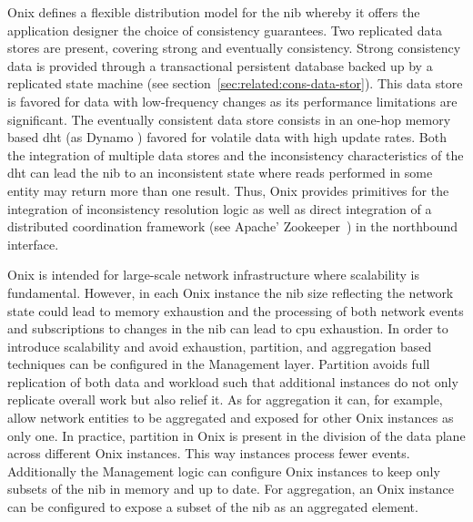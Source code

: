 Onix defines a flexible distribution model for the \gls{nib} whereby  it offers the application designer the choice of consistency guarantees. 
Two replicated data stores are present, covering  strong  and eventually consistency. 
Strong consistency data is provided through a transactional persistent database backed up by a replicated state machine (see section~\ref{sec:related:cons-data-stor}). 
This data store is favored for data with low-frequency changes  as its performance limitations are significant. 
The eventually consistent data store consists in  an one-hop memory based \gls{dht}  (as Dynamo  \cite{DeCandia:2007cn}) favored for  volatile data with high update rates. 
Both the integration of multiple data stores and the inconsistency characteristics of the \gls{dht} can lead the \gls{nib} to an inconsistent state where reads performed in some entity may return more than one result. 
Thus, Onix provides primitives for the integration of inconsistency resolution logic as well as  direct integration of a distributed coordination framework (see  Apache' Zookeeper~\cite{Hunt:2010ux}) in the northbound interface. 

Onix is intended for large-scale network infrastructure where scalability is fundamental. 
However, in each Onix instance the \gls{nib}  size reflecting the network state could lead to memory exhaustion and the processing of both network events and subscriptions  to changes in  the \gls{nib}  can lead to \gls{cpu} exhaustion.
In order to introduce scalability and avoid exhaustion, partition, and aggregation based techniques can be configured in the Management layer. 
Partition avoids full replication of both data  and workload such that additional instances do not only replicate overall work but also relief it. 
As for aggregation it can, for example, allow network entities to be aggregated and exposed for other Onix instances as only one.
In practice, partition in Onix is present in the division of the data plane across different Onix instances.  
This way instances process fewer events. 
Additionally the Management logic can configure Onix instances to keep only subsets of the \gls{nib} in memory and up to date. 
For aggregation, an Onix instance can be configured to expose a subset of the \gls{nib} as an aggregated element. 

